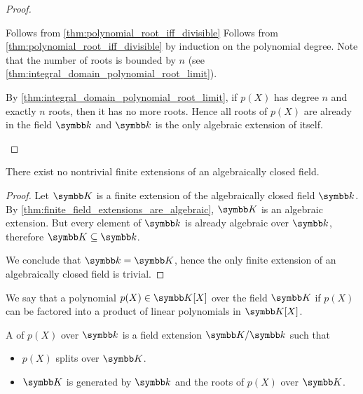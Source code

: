 \begin{proof}
\begin{description}
     Follows from \cref{thm:polynomial_root_iff_divisible} Follows from \cref{thm:polynomial_root_iff_divisible} by induction on the polynomial degree. Note that the number of roots is bounded by \( n \) (see \cref{thm:integral_domain_polynomial_root_limit}).

     By \cref{thm:integral_domain_polynomial_root_limit}, if \( p(X) \) has degree \( n \) and exactly \( n \) roots, then it has no more roots. Hence all roots of \( p(X) \) are already in the field \( \Bk \) and \( \Bk \) is the only algebraic extension of itself.
  \end{description}
\end{proof}

\begin{proposition}\label{thm:no_finite_extensions_of_closed_fields}
  There exist no nontrivial finite extensions of an algebraically closed field.
\end{proposition}
\begin{proof}
  Let \( \BK \) is a finite extension of the algebraically closed field \( \Bk \). By \cref{thm:finite_field_extensions_are_algebraic}, \( \BK \) is an algebraic extension. But every element of \( \Bk \) is already algebraic over \( \Bk \), therefore \( \BK \subseteq \Bk \).

  We conclude that \( \Bk = \BK \), hence the only finite extension of an algebraically closed field is trivial.
\end{proof}

\begin{definition}\label{def:splitting_field}\cite[458]{Knapp2016BAlg}
  We say that a polynomial \( p(X) \in \BK[X] \) over the field \( \BK \)  if \( p(X) \) can be factored into a product of linear polynomials in \( \BK[X] \).

  A  of \( p(X) \) over \( \Bk \) is a field extension \( \BK / \Bk \) such that
  \begin{itemize}
    \item \( p(X) \) splits over \( \BK \).
    \item \( \BK \) is generated by \( \Bk \) and the roots of \( p(X) \) over \( \BK \).
  \end{itemize}
\end{definition}

